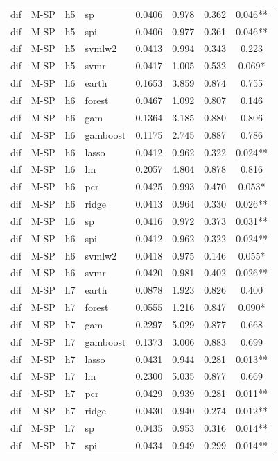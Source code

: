 \begin{ThreePartTable}
\begin{longtable}[t]{llclcccc}
dif & M-SP & h5 & sp & 0.0406 & 0.978 & 0.362 & 0.046**\\
dif & M-SP & h5 & spi & 0.0406 & 0.977 & 0.361 & 0.046**\\
dif & M-SP & h5 & svmlw2 & 0.0413 & 0.994 & 0.343 & 0.223\\
dif & M-SP & h5 & svmr & 0.0417 & 1.005 & 0.532 & 0.069*\\
\addlinespace
dif & M-SP & h6 & earth & 0.1653 & 3.859 & 0.874 & 0.755\\
dif & M-SP & h6 & forest & 0.0467 & 1.092 & 0.807 & 0.146\\
dif & M-SP & h6 & gam & 0.1364 & 3.185 & 0.880 & 0.806\\
dif & M-SP & h6 & gamboost & 0.1175 & 2.745 & 0.887 & 0.786\\
dif & M-SP & h6 & lasso & 0.0412 & 0.962 & 0.322 & 0.024**\\
dif & M-SP & h6 & lm & 0.2057 & 4.804 & 0.878 & 0.816\\
dif & M-SP & h6 & pcr & 0.0425 & 0.993 & 0.470 & 0.053*\\
dif & M-SP & h6 & ridge & 0.0413 & 0.964 & 0.330 & 0.026**\\
dif & M-SP & h6 & sp & 0.0416 & 0.972 & 0.373 & 0.031**\\
dif & M-SP & h6 & spi & 0.0412 & 0.962 & 0.322 & 0.024**\\
dif & M-SP & h6 & svmlw2 & 0.0418 & 0.975 & 0.146 & 0.055*\\
dif & M-SP & h6 & svmr & 0.0420 & 0.981 & 0.402 & 0.026**\\
\addlinespace
dif & M-SP & h7 & earth & 0.0878 & 1.923 & 0.826 & 0.400\\
dif & M-SP & h7 & forest & 0.0555 & 1.216 & 0.847 & 0.090*\\
dif & M-SP & h7 & gam & 0.2297 & 5.029 & 0.877 & 0.668\\
dif & M-SP & h7 & gamboost & 0.1373 & 3.006 & 0.883 & 0.699\\
dif & M-SP & h7 & lasso & 0.0431 & 0.944 & 0.281 & 0.013**\\
dif & M-SP & h7 & lm & 0.2300 & 5.035 & 0.877 & 0.669\\
dif & M-SP & h7 & pcr & 0.0429 & 0.939 & 0.281 & 0.011**\\
dif & M-SP & h7 & ridge & 0.0430 & 0.940 & 0.274 & 0.012**\\
dif & M-SP & h7 & sp & 0.0435 & 0.953 & 0.316 & 0.014**\\
dif & M-SP & h7 & spi & 0.0434 & 0.949 & 0.299 & 0.014**\\

\end{longtable}
\end{ThreePartTable}
